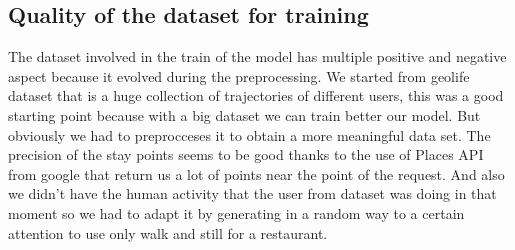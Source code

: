 \documentclass[../../main]{subfiles}
\begin{document}
\label{ss:quality-training-dataset}
\subsection{Quality of the dataset for training}

The dataset involved in the train of the model has multiple positive and negative aspect because it evolved during the preprocessing.
We started from geolife dataset that is a huge collection of trajectories of different users, this was a good starting point 
because with a big dataset we can train better our model. But obviously we had to preprocceses it to obtain a more meaningful data set. 
The precision of the stay points seems to be good thanks to the use of Places API from google that return us a lot of points near the point of the request.
And also we didn't have the human activity that the user from dataset was doing in that moment so we had to adapt it by generating in a random way to a certain
attention to use only walk and still for a restaurant.
\end{document}
